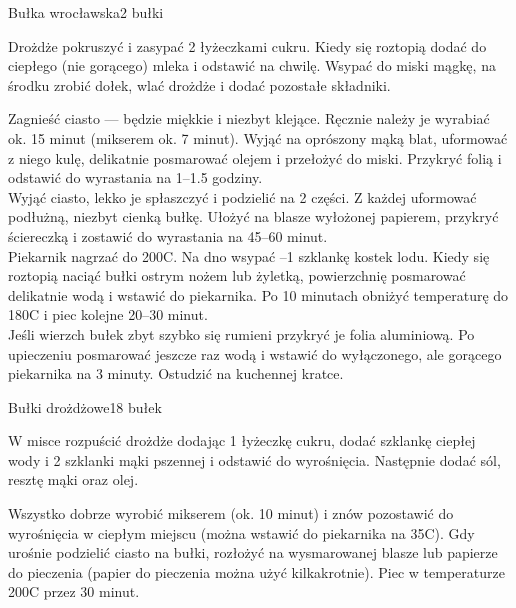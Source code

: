 \documentclass[a4paper,12pt]{article}
\begin{document}
\newpage
\begin{recipe}{Bułka wrocławska}{2 bułki}{}

Drożdże pokruszyć i zasypać 2 łyżeczkami cukru. Kiedy się roztopią dodać do ciepłego (nie gorącego) mleka i odstawić na chwilę. Wsypać do miski mągkę, na środku zrobić dołek, wlać drożdże i dodać
pozostałe składniki.
\freeform%

Zagnieść ciasto --- będzie miękkie i niezbyt klejące. Ręcznie należy je wyrabiać ok. 15 minut (mikserem ok. 7 minut). Wyjąć na oprószony mąką blat, uformować z niego kulę, delikatnie posmarować
olejem i przełożyć do miski. Przykryć folią i odstawić do wyrastania na 1--1.5 godziny. \\

Wyjąć ciasto, lekko je spłaszczyć i podzielić na 2 części. Z każdej uformować podłużną, niezbyt cienką bułkę. Ułożyć na blasze wyłożonej papierem, przykryć ściereczką i zostawić do wyrastania na
45--60 minut.\\

Piekarnik nagrzać do 200\0C. Na dno wsypać --1 szklankę kostek lodu. Kiedy się roztopią naciąć bułki ostrym nożem lub żyletką, powierzchnię posmarować delikatnie wodą i wstawić do piekarnika.
Po 10 minutach obniżyć temperaturę do 180\0C i piec kolejne 20--30 minut.\\

Jeśli wierzch bułek zbyt szybko się rumieni przykryć je folia aluminiową. Po upieczeniu posmarować jeszcze raz wodą i wstawić do wyłączonego, ale gorącego piekarnika na 3 minuty. Ostudzić na
kuchennej kratce.

\end{recipe}


\newpage
\begin{recipe}{Bułki drożdżowe}{18 bułek}{}

W misce rozpuścić drożdże dodając 1 łyżeczkę cukru, dodać szklankę ciepłej wody i 2 szklanki mąki pszennej i odstawić do wyrośnięcia. Następnie dodać sól, resztę mąki oraz olej.

\freeform%
Wszystko dobrze wyrobić mikserem (ok. 10 minut) i znów pozostawić do wyrośnięcia w ciepłym miejscu (można wstawić do piekarnika na 35\0C). Gdy urośnie podzielić ciasto na bułki, rozłożyć na wysmarowanej blasze lub papierze
do pieczenia (papier do pieczenia można użyć kilkakrotnie). Piec w temperaturze 200\0C przez 30 minut. 

\end{recipe}
\end{document}

